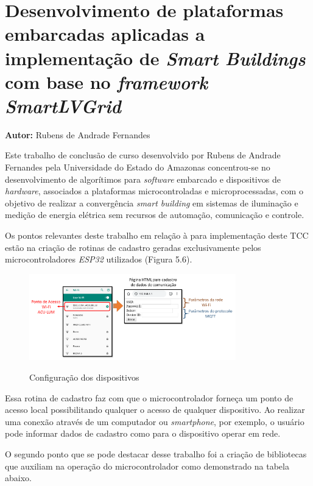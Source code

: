 \newpage

\section{Desenvolvimento de plataformas embarcadas aplicadas a implementação de \textit{Smart Buildings} com base no \textit{framework SmartLVGrid}}

\textbf{Autor:} Rubens de Andrade Fernandes
\vspace{\onelineskip}

Este trabalho de conclusão de curso desenvolvido por Rubens de Andrade Fernandes pela Universidade do Estado do Amazonas concentrou-se no desenvolvimento de algorítimos para \textit{software} embarcado e dispositivos
de \textit{hardware}, associados a plataformas microcontroladas e microprocessadas, com o objetivo de realizar a convergência \textit{smart building} em sistemas de iluminação e medição de energia elétrica sem recursos de automação, comunicação e controle.

Os pontos relevantes deste trabalho em relação à para implementação deste TCC estão na criação de rotinas de cadastro geradas exclusivamente pelos microcontroladores \textit{ESP32} utilizados (Figura 5.6). 

\begin{figure}[H]
	\centering
	
	\caption{Configuração dos dispositivos}
	\includegraphics[width=0.8\textwidth]{figuras/trabalhos_relacionados/fig06.png}
	\label{fig:trab06}
\end{figure}

Essa rotina de cadastro faz com que o microcontrolador forneça um ponto de acesso local possibilitando qualquer o acesso de qualquer dispositivo. Ao realizar uma conexão através de um computador ou \textit{smartphone}, por exemplo, o usuário pode informar dados de cadastro como para o dispositivo operar em rede.

O segundo ponto que se pode destacar desse trabalho foi a criação de bibliotecas que auxiliam na operação do microcontrolador como demonstrado na tabela abaixo. 

